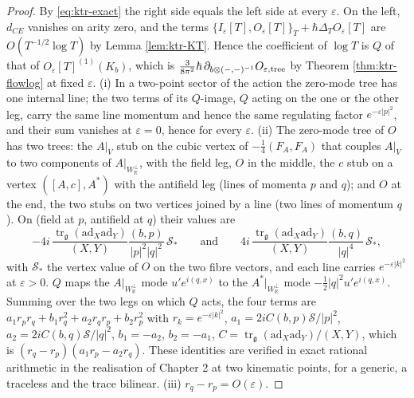 \begin{proof}
By \eqref{eq:ktr-exact} the right side equals the left side at every $\varepsilon$. On the left, $d_{CE}$ vanishes on arity zero, and the terms $\{I_\varepsilon[T],O_\varepsilon[T]\}_T+\hbar\Delta_TO_\varepsilon[T]$ are $O(T^{-1/2}\log T)$ by Lemma \ref{lem:ktr-KT}. Hence the coefficient of $\log T$ is $Q$ of that of $O_\varepsilon[T]^{(1)}(K_b)$, which is $\tfrac{3}{8\pi^2}\hbar\,\partial_{b\otimes(-,-)^{-1}}O_{\varepsilon,\rm tree}$ by Theorem \ref{thm:ktr-flowlog} at fixed $\varepsilon$. (i) In a two-point sector of the action the zero-mode tree has one internal line; the two terms of its $Q$-image, $Q$ acting on the one or the other leg, carry the same line momentum and hence the same regulating factor $e^{-\varepsilon|p|^2}$, and their sum vanishes at $\varepsilon=0$, hence for every $\varepsilon$. (ii) The zero-mode tree of $O$ has two trees: the $A|_V$ stub on the cubic vertex of $-\tfrac14(F_A,F_A)$ that couples $A|_V$ to two components of $A|_{W_{\mathbb R}^\perp}$, with the field leg, $O$ in the middle, the $c$ stub on a vertex $([A,c],A^*)$ with the antifield leg (lines of momenta $p$ and $q$); and $O$ at the end, the two stubs on two vertices joined by a line (two lines of momentum $q$). On (field at $p$, antifield at $q$) their values are
\[
-4i\,\frac{\operatorname{tr}_{\mathfrak g}(\mathrm{ad}_X\mathrm{ad}_Y)}{(X,Y)}\frac{(b,p)}{|p|^2|q|^2}\,\mathcal S_*\qquad\text{and}\qquad 4i\,\frac{\operatorname{tr}_{\mathfrak g}(\mathrm{ad}_X\mathrm{ad}_Y)}{(X,Y)}\frac{(b,q)}{|q|^4}\,\mathcal S_*,
\]
with $\mathcal S_*$ the vertex value of $O$ on the two fibre vectors, and each line carries $e^{-\varepsilon|k|^2}$ at $\varepsilon>0$. $Q$ maps the $A|_{W_{\mathbb R}^\perp}$ mode $u'e^{i(q,x)}$ to the $A^*|_{W_{\mathbb R}^\perp}$ mode $-\tfrac12|q|^2u'e^{i(q,x)}$. Summing over the two legs on which $Q$ acts, the four terms are $a_1r_pr_q+b_1r_q^2+a_2r_qr_p+b_2r_p^2$ with $r_k=e^{-\varepsilon|k|^2}$, $a_1=2iC(b,p)\mathcal S/|p|^2$, $a_2=2iC(b,q)\mathcal S/|q|^2$, $b_1=-a_2$, $b_2=-a_1$, $C=\operatorname{tr}_{\mathfrak g}(\mathrm{ad}_X\mathrm{ad}_Y)/(X,Y)$, which is $(r_q-r_p)(a_1r_p-a_2r_q)$. These identities are verified in exact rational arithmetic in the realisation of Chapter 2 at two kinematic points, for a generic, a traceless and the trace bilinear. (iii) $r_q-r_p=O(\varepsilon)$.
\end{proof}

